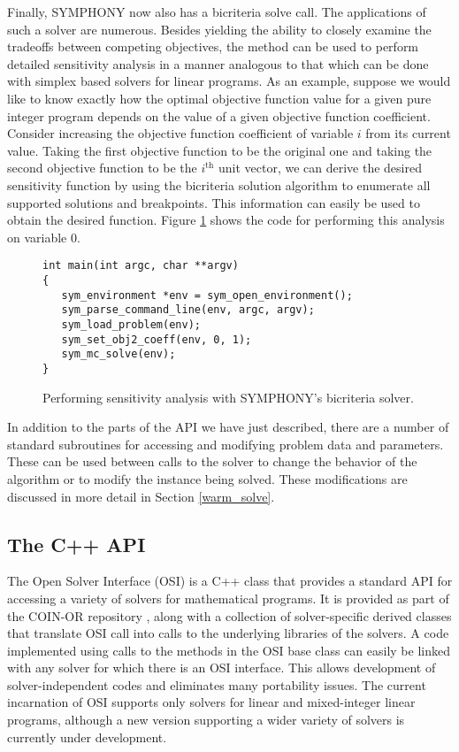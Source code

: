 Finally, SYMPHONY now also has a bicriteria solve call. The applications of
such a solver are numerous. Besides yielding the ability to closely examine
the tradeoffs between competing objectives, the method can be used to perform
detailed sensitivity analysis in a manner analogous to that which can be done
with simplex based solvers for linear programs. As an example, suppose we
would like to know exactly how the optimal objective function value for a
given pure integer program depends on the value of a given objective function
coefficient. Consider increasing the objective function
coefficient of variable $i$ from its current value. Taking the first objective
function to be the original one and taking the second objective function to be
the $i^\textrm{th}$ unit vector, we can derive the desired sensitivity
function by using the bicriteria solution algorithm to enumerate all supported
solutions and breakpoints. This information can easily be used to obtain the
desired function. Figure \ref{multi_criteria} shows the code for performing
this analysis on variable 0. 
\begin{figure}[tb]
{\color{Brown}
\begin{Verbatim}[frame=lines]
int main(int argc, char **argv)
{
   sym_environment *env = sym_open_environment();
   sym_parse_command_line(env, argc, argv);
   sym_load_problem(env);
   sym_set_obj2_coeff(env, 0, 1);
   sym_mc_solve(env);
}
\end{Verbatim}
}
\caption{Performing sensitivity analysis with SYMPHONY's bicriteria solver.
\label{multi_criteria}}
\end{figure}

In addition to the parts of the API we have just described, there are a number
of standard subroutines for accessing and modifying problem data and
parameters. These can be used between calls to the solver to change the
behavior of the algorithm or to modify the instance being solved. These
modifications are discussed in more detail in Section \ref{warm_solve}.

\subsection{The C++ API}\label{OSI}

The Open Solver Interface (OSI) is a C++ class that provides a standard API
for accessing a variety of solvers for mathematical programs. It is provided
as part of the COIN-OR repository \cite{coin-or}, along with a collection of
solver-specific derived classes that translate OSI call into calls to the
underlying libraries of the solvers. A code implemented using calls to the
methods in the OSI base class can easily be linked with any solver for which
there is an OSI interface. This allows development of solver-independent codes
and eliminates many portability issues. The current incarnation of OSI
supports only solvers for linear and mixed-integer linear programs, although a
new version supporting a wider variety of solvers is currently under
development.

